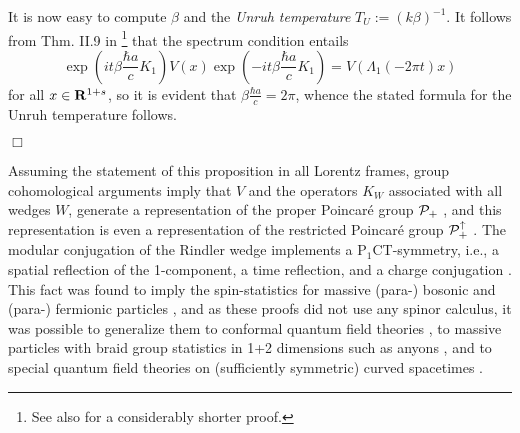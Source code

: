 \documentclass[a4paper,11pt]{article}
\def\dt{\cal}
\def\dM{{\dt M}}
\def\P{{\cal P}}
\def\go{\omega}
\def\Halmos{\quad\hfill$\Box$}
\def\pct{P$_1$CT}
\def\Rd{\reals^{1+s}}
\def\reals{{\bf R}}
\begin{document}
It is now easy to compute $\beta$ and
the {\em Unruh temperature} $T_U:=(k\beta)^{-1}$. It follows from Thm.
II.9 in \cite{Bor92}\footnote{
See also \cite{Flo98} for a considerably shorter proof.}
that the spectrum condition entails
$$\exp\left(it\beta\frac{\hbar a}{c}K_1\right)V(x)
\exp\left(-it\beta\frac{\hbar a}{c}K_1\right)=
V(\Lambda_1(-2\pi t)x)$$
for all $x\in\Rd$,
so it is evident that $\beta\frac{\hbar a}{c}=2\pi$, whence
the stated formula for the Unruh temperature follows.

\Halmos

Assuming the statement of this proposition in all Lorentz frames,
group cohomological arguments imply that
$V$ and the operators $K_W$ associated with all wedges $W$,
generate a representation
of the proper Poincar\'e group $\P_+$ \cite{BGL93}, and
this representation is even a representation
of the restricted Poincar\'e group $\P_+^\uparrow$ \cite{GL95}. The
modular conjugation of the Rindler wedge implements a
\pct-symmetry, i.e., a spatial reflection of the 1-component, a
time reflection, and a charge conjugation \cite{GL95}.
This fact was found to imply the spin-statistics for massive
(para-) bosonic and (para-) fermionic particles
\cite{GL95,Kuc95}, and as these proofs did not use any
spinor calculus, it was possible to generalize them to
conformal quantum field theories \cite{GL96}, to
massive particles with braid group statistics in 1+2 dimensions
such as anyons \cite{Lon97,Mun98}, and to special quantum field theories
on (sufficiently symmetric) curved spacetimes \cite{GLRV}.


\end{document}
